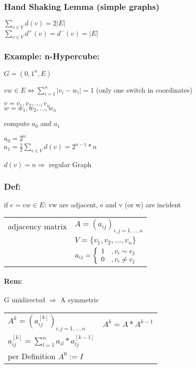 \subsubsection*{Hand Shaking Lemma (simple graphs)}
$\sum_{v \in V} d(v) = 2 |E|$\\
$\sum_{v \in V} d^+(v) = d^-(v) = |E|$

\subsubsection*{Example: n-Hypercube:}
$G = ({0,1}^n, E)$

$vw \in E \Leftrightarrow \sum_{i=1}^{n} |v_i - w_i | = 1$ (only one switch in coordinates)

$v = v_1, v_2, \ldots , v_n$\\
$w = w_1, w_2, \ldots , w_n$

compute $a_0$ and $a_1$

$a_0 = 2^n$ \\
$a_1 = \frac{1}{2} \sum_{v \in V} d(v) = 2^{n-1} * n$

$d(v) = n \Rightarrow $ regular Graph

\subsubsection*{Def:}
if $e = vw \in E$: vw are adjacent, e and v (or w) are incident

\begin{tabular}{l l}
adjacency matrix & $A = (a_{ij})_{i,j = 1, \ldots , n}$ \\
	& $ V = \{v_1, v_2, \ldots , v_n \} $ \\
	& $ a_{ij} = \left \{ \begin{array}{l l} 1 &, v_i \sim v_j  \\ 0 & , v_i \not\sim v_j \end{array} \right. $ \\

\end{tabular}

\paragraph*{Rem:}
G unidirected $\Rightarrow$ A symmetric

\vspace{12pt}

\begin{tabular}{l l}
$A^k = (a_{ij}^{[k]})_{i,j = 1,\ldots , n}$ &

$A^k =A * A^{k-1}$ \\

$a_{ij}^{[k]} = \sum_{l=1}^n a_{il} * a_{lj}^{[k-1]} $ \\

per Definition $A^0 := I$ \\

\end{tabular}

